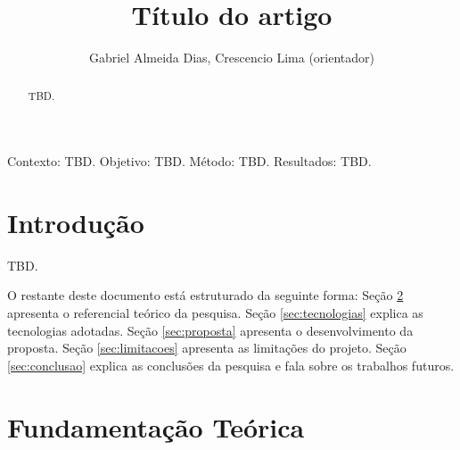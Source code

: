 \documentclass[12pt]{article}
\title{Título do artigo}
\author{Gabriel Almeida Dias\inst{1}, Crescencio Lima (orientador)\inst{1} }
\newcommand{\cl}[1]{\textcolor{red}{\textbf{[Crescencio: #1]}}}
\begin{document}
 

\maketitle

\begin{abstract}
TBD.
\end{abstract}

     

\begin{resumo} 
Contexto: TBD.
Objetivo: TBD.
Método: TBD. 
Resultados: TBD.
  
\end{resumo}


\section{Introdução}

TBD.

O restante deste documento está estruturado da seguinte forma: Seção \ref{sec:referencial_teorico} apresenta o referencial teórico da pesquisa. Seção \ref{sec:tecnologias} explica as tecnologias adotadas. Seção \ref{sec:proposta} apresenta o desenvolvimento da proposta. Seção \ref{sec:limitacoes} apresenta as limitações do projeto. Seção \ref{sec:conclusao} explica as conclusões da pesquisa e fala sobre os trabalhos futuros.

\section{Fundamentação Teórica} \label{sec:referencial_teorico}


\end{document}
